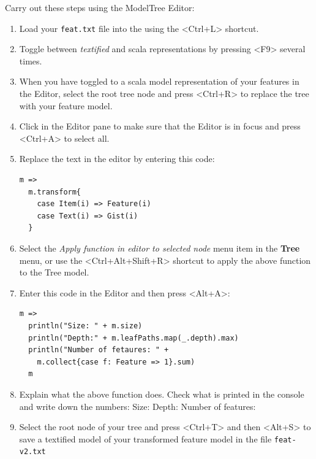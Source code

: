 \documentclass[11pt]{article}
\begin{document}
\begin{framed}
Carry out these steps using the ModelTree Editor:
\begin{enumerate}
\item Load your \verb+feat.txt+ file into the using the <Ctrl+L> shortcut.
\item Toggle between {\it textified} and scala representations by pressing <F9> several times.
\item When you have toggled to a scala model representation of your features in the Editor, select the root tree node and press <Ctrl+R> to replace the tree with your feature model.
\item Click in the Editor pane to make sure that the Editor is in focus and press <Ctrl+A> to select all.
\item Replace the text in the editor by entering this code: {\scriptsize\begin{verbatim}
m =>
  m.transform{
    case Item(i) => Feature(i)
    case Text(i) => Gist(i)
  }
\end{verbatim}}
\item Select the {\it Apply function in editor to selected node} menu item in the {\bf Tree} menu, or use the <Ctrl+Alt+Shift+R> shortcut to apply the above function to the Tree model.
\item Enter this code in the Editor and then press <Alt+A>: {\scriptsize\begin{verbatim}
m =>
  println("Size: " + m.size)
  println("Depth:" + m.leafPaths.map(_.depth).max)
  println("Number of fetaures: " + 
    m.collect{case f: Feature => 1}.sum)
  m
\end{verbatim}}
\item Explain what the above function does. Check what is printed in the console and write down the numbers: 
\newline Size: \underline{\hspace{2cm}}
\newline Depth: \underline{\hspace{2cm}}
\newline Number of features: \underline{\hspace{2cm}}

\item Select the root node of your tree and press <Ctrl+T> and then <Alt+S> to save a textified model of your transformed feature model in the file \verb+feat-v2.txt+
\end{enumerate}
\end{framed}
\end{document}
